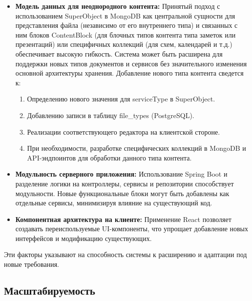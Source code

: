 \begin{itemize}
    \item \textbf{Модель данных для неоднородного контента:} Принятый подход с использованием SuperObject в MongoDB как центральной сущности для представления файла (независимо от его внутреннего типа) и связанных с ним блоков ContentBlock (для блочных типов контента типа заметок или презентаций) или специфичных коллекций (для схем, календарей и т.д.) обеспечивает высокую гибкость. Система может быть расширена для поддержки новых типов документов и сервисов без значительного изменения основной архитектуры хранения. Добавление нового типа контента сведется к:
        \begin{enumerate}
            \item Определению нового значения для serviceType в SuperObject.
            \item Добавлению записи в таблицу file\_types (PostgreSQL).
            \item Реализации соответствующего редактора на клиентской стороне.
            \item При необходимости, разработке специфических коллекций в MongoDB и API-эндпоинтов для обработки данного типа контента.
        \end{enumerate}
    \item \textbf{Модульность серверного приложения:} Использование Spring Boot и разделение логики на контроллеры, сервисы и репозитории способствует модульности. Новые функциональные блоки могут быть добавлены как отдельные сервисы, минимизируя влияние на существующий код.
    \item \textbf{Компонентная архитектура на клиенте:} Применение React позволяет создавать переиспользуемые UI-компоненты, что упрощает добавление новых интерфейсов и модификацию существующих.
\end{itemize}
Эти факторы указывают на способность системы к расширению и адаптации под новые требования.

\subsection{Масштабируемость}


